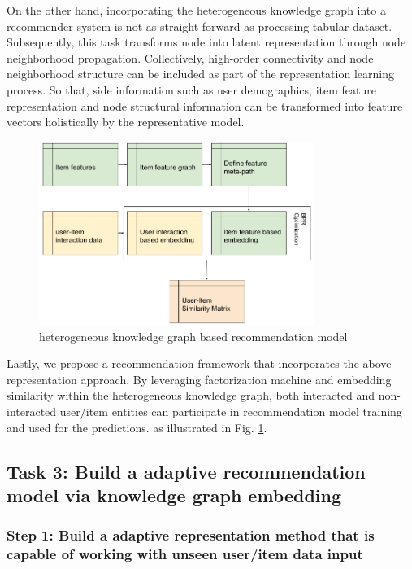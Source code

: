 On the other hand, incorporating the heterogeneous knowledge graph into a recommender system is not as straight forward as processing tabular dataset. Subsequently, this task transforms node into latent representation through node neighborhood propagation. Collectively, high-order connectivity and node neighborhood structure can be included as part of the representation learning process. So that, side information such as user demographics, item feature representation and node structural information can be transformed into feature vectors holistically by the representative model.

\begin{figure}[!ht]
    \centering
    \includegraphics[width=0.8\textwidth]{figs/hkg.png}
    \caption{heterogeneous knowledge graph based recommendation model}\label{fig:2_stage_embedding}
\end{figure}

Lastly, we propose a recommendation framework that incorporates the above representation approach. By leveraging factorization machine and embedding similarity within the heterogeneous knowledge graph, both interacted and non-interacted user/item entities can participate in recommendation model training and used for the predictions. as illustrated in Fig. \ref{fig:2_stage_embedding}.

\subsection{Task 3: Build a adaptive recommendation model via knowledge graph embedding}

\subsubsection*{Step 1: Build a adaptive representation method that is capable of working with unseen user/item data input}

